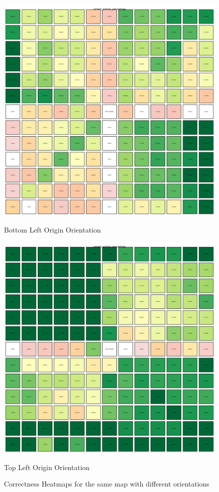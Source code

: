 \begin{figure}[ht]
  \centering
  \begin{minipage}[b]{0.45\textwidth}
    \centering
    \includegraphics[width=\textwidth]{
      images/results_discussion/correctness_hm_BL.png
    }
    \caption{Bottom Left Origin Orientation}
    \label{fig:heatmapBL}
  \end{minipage}
  \hfill
  \begin{minipage}[b]{0.45\textwidth}
    \centering
    \includegraphics[width=\textwidth]{
      images/results_discussion/correctness_hm_TL.png
    }
    \caption{Top Left Origin Orientation}
    \label{fig:heatmapTL}
  \end{minipage}
  \caption{Correctness Heatmaps for the same map with different orientations}
  \label{fig:orientation_correctness}
\end{figure}
